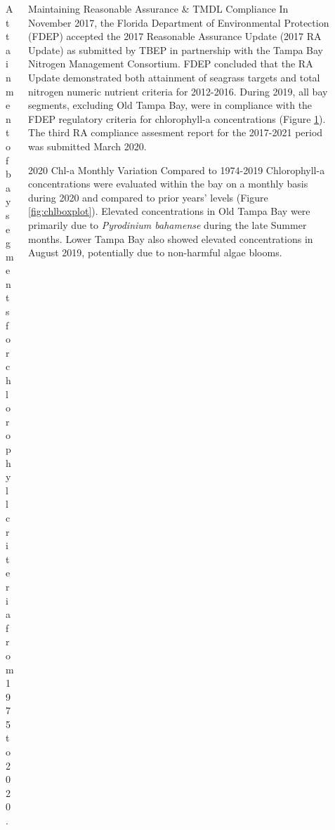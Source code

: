 \documentclass[final,t]{beamer}\usepackage[]{graphicx}\usepackage[]{color}
\begin{document}
\begin{frame}
\begin{columns}[t]
\begin{column}{.2\linewidth}
\begin{figure}
\caption{\footnotesize Attainment of bay segments for chlorophyll criteria from 1975 to 2020.}
\label{fig:chlmat}
\end{figure}

\end{column}

\begin{column}{.79\linewidth}

\begin{block}{Maintaining Reasonable Assurance \& TMDL Compliance}
\footnotesize
In November 2017, the Florida Department of Environmental Protection (FDEP) accepted the 2017 Reasonable Assurance Update (2017 RA Update) as submitted by TBEP in partnership with the Tampa Bay Nitrogen Management Consortium. FDEP concluded that the RA Update demonstrated both attainment of seagrass targets and total nitrogen numeric nutrient criteria for 2012-2016. During 2019, all bay segments, excluding Old Tampa Bay, were in compliance with the FDEP regulatory criteria for chlorophyll-a concentrations (Figure \ref{fig:chlmat}). The third RA compliance assesment report for the 2017-2021 period was submitted March 2020. 
\end{block}

\begin{block}{2020 Chl-a Monthly Variation Compared to 1974-2019}
\footnotesize
Chlorophyll-a concentrations were evaluated within the bay on a monthly basis during 2020 and compared to prior years' levels (Figure \ref{fig:chlboxplot}). Elevated concentrations in Old Tampa Bay were primarily due to \textit{Pyrodinium bahamense} during the late Summer months. Lower Tampa Bay also showed elevated concentrations in August 2019, potentially due to non-harmful algae blooms.
\end{block}



\vspace{-0.2in}


\end{column}
\end{columns}
\end{frame}
\end{document}
